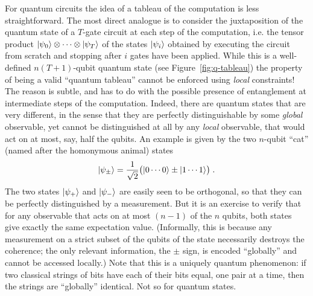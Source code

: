 For quantum circuits the idea of a tableau of the computation is less straightforward. The most direct analogue is to consider the juxtaposition of the quantum state of a $T$-gate circuit at each step of the computation, i.e. the tensor product $|\psi_0\rangle\otimes \cdots\otimes |\psi_T\rangle$ of the states $|\psi_i\rangle$ obtained by executing the circuit from scratch and stopping after $i$ gates have been applied. While this is a well-defined $n(T+1)$-qubit quantum state (see Figure~\ref{fig:q-tableau}) the property of being a valid ``quantum tableau'' cannot be enforced using \emph{local} constraints! The reason is subtle, and has to do with the possible presence of entanglement at intermediate steps of the computation. Indeed, there are quantum states that are very different, in the sense that they are perfectly distinguishable by some \emph{global} observable, yet cannot be distinguished at all by any \emph{local} observable, that would act on at most, say, half the qubits. An example is given by the two $n$-qubit ``cat'' (named after the homonymous animal) states
\[ |\psi_{\pm}\rangle = \frac{1}{\sqrt{2}} \big( |0\cdots 0\rangle \pm |1\cdots 1\rangle \big)\;.\]
The two states $|\psi_+\rangle$ and $|\psi_-\rangle$ are easily seen to be orthogonal, so that they can be perfectly distinguished by a measurement. But it is an exercise to verify that for any observable that acts on at most $(n-1)$ of the $n$ qubits, both states give exactly the same expectation value. (Informally, this is because any measurement on a strict subset of the qubits of the state necessarily destroys the coherence; the only relevant information, the $\pm$ sign, is encoded ``globally'' and cannot be accessed locally.)
Note that this is a uniquely quantum phenomenon: if two classical strings of bits have each of their bits equal, one pair at a time, then the strings are ``globally'' identical. Not so for quantum states.

